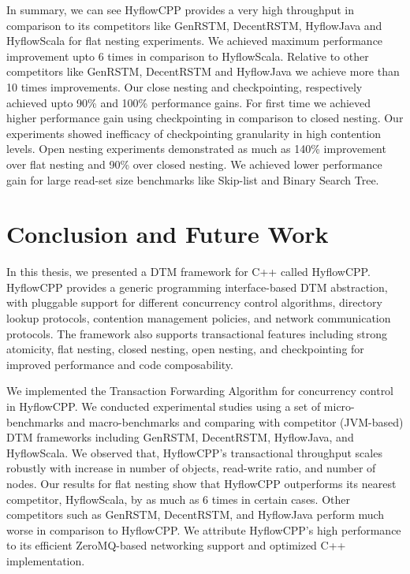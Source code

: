 \documentclass[12pt,english]{report}
\begin{document}
In summary, we can see HyflowCPP provides a very high throughput in comparison to its competitors like GenRSTM, DecentRSTM, HyflowJava and HyflowScala for flat nesting experiments. We achieved maximum performance improvement upto 6 times in comparison to HyflowScala. Relative to other competitors like GenRSTM, DecentRSTM and HyflowJava we achieve more than 10 times improvements. Our close nesting and checkpointing, respectively achieved upto 90\% and 100\% performance gains. For first time we achieved higher performance gain using checkpointing in comparison to closed nesting. Our experiments showed inefficacy of checkpointing granularity in high contention levels. Open nesting experiments demonstrated as much as 140\% improvement over flat nesting and 90\% over closed nesting. We achieved lower performance gain for large read-set size benchmarks like Skip-list and Binary Search Tree.

\chapter{Conclusion and Future Work}\label{chap:conclusion}

In this thesis, we presented a DTM framework for C++ called HyflowCPP. HyflowCPP provides a generic programming interface-based DTM abstraction, with pluggable support for different concurrency control algorithms, directory lookup protocols, contention management policies, and network communication protocols. The framework also supports transactional features including strong atomicity, flat nesting, closed nesting, open nesting, and checkpointing for improved performance and code composability.

We implemented the Transaction Forwarding Algorithm for concurrency control in HyflowCPP. We conducted experimental studies using a set of micro-benchmarks and macro-benchmarks and comparing with competitor (JVM-based) DTM frameworks including GenRSTM, DecentRSTM, HyflowJava, and HyflowScala. We observed that, HyflowCPP's transactional throughput scales robustly with increase in number of objects, read-write ratio, and number of nodes. Our results for flat nesting show that HyflowCPP outperforms its nearest competitor, HyflowScala, by as much as 6 times in certain cases. Other competitors such as GenRSTM, DecentRSTM, and HyflowJava perform much worse in comparison to HyflowCPP. We attribute HyflowCPP's high performance to its efficient ZeroMQ-based networking support and optimized C++ implementation.
\end{document}
